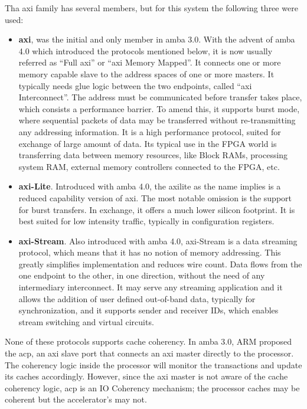 Tha \gls{axi} family has several members, but for this system the following three were used:
\begin{itemize}
\item	\textbf{\gls{axi}}, was the initial and only member in \gls{amba} 3.0. 
	With the advent of \gls{amba} 4.0 which introduced
	the protocols mentioned below, it is now usually 
	referred as ``Full \gls{axi}'' or ``\gls{axi} Memory Mapped''.
	It connects one or more memory capable slave to the 
	address spaces of one or more masters. 
	It typically needs glue logic between the two endpoints, 
	called ``\gls{axi} Interconnect''. 
	The address must be communicated before transfer takes place, 
	which consists a performance barrier.
	To amend this, it supports \gls{burst} mode, 
	where sequential packets of data may be transferred without
	re-transmitting any addressing information. 
	It is a high performance protocol, 
	suited for exchange of large amount of data. 
	Its typical use in the FPGA world is 
	transferring data between memory resources,
 	like Block RAMs, processing system RAM, 
	external memory controllers connected to the FPGA, etc.
\item	\textbf{\gls{axi}-Lite}. Introduced with \gls{amba} 4.0, 
	the \gls{axilite} as the  name implies 
	is a reduced capability version of \gls{axi}. 
	The most notable omission is the support for \gls{burst} transfers. 
	In exchange, it offers a much lower silicon footprint. 
	It is best suited for low intensity traffic, 
	typically in configuration registers.
\item	\textbf{\gls{axi}-Stream}. Also introduced with \gls{amba} 4.0, 
	\gls{axi}-Stream is a data streaming protocol,
	which means that it has no notion of memory addressing.
	This greatly simplifies implementation and reduces wire count.
	Data flows from the one endpoint to the other, in one direction, 
	without the need of any intermediary interconnect.
	It may serve any streaming application and it allows 
	the addition of user defined out-of-band data,
	typically for synchronization, and it supports sender and receiver IDs, 
	which enables stream switching and virtual circuits.
\end{itemize}

None of these protocols supports cache coherency. 
In \gls{amba} 3.0, ARM proposed the \gls{acp}, 
an \gls{axi} slave port that connects an \gls{axi} master directly to the processor.
The coherency logic inside the processor 
will monitor the transactions and update its caches accordingly.
However, since the \gls{axi} master is not aware of the cache coherency logic, 
\gls{acp} is an \gls{IO Coherency} mechanism;
the processor caches may be coherent but the accelerator's may not.

